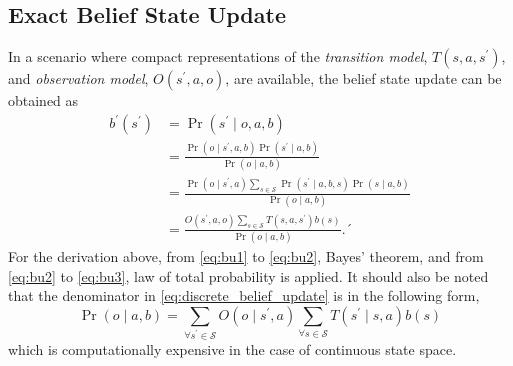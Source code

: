\subsection{Exact Belief State Update}
\label{sec:exact_update}
In a scenario where compact representations of the \textit{transition model}, $ T(s, a, s^{\prime})$,  and \textit{observation model}, $ O(s^{\prime}, a, o) $, are available, the belief state update can be obtained as \cite{KAELBLING199899}
\begin{align}
b^{\prime}\left(s^{\prime}\right) &=\operatorname{Pr}\left(s^{\prime} \mid o, a, b\right) \label{eq:bu1}\\
&=\frac{\operatorname{Pr}\left(o \mid s^{\prime}, a, b\right) \operatorname{Pr}\left(s^{\prime} \mid a, b\right)}{\operatorname{Pr}(o \mid a, b)} \label{eq:bu2}\\
&=\frac{\operatorname{Pr}\left(o \mid s^{\prime}, a\right) \sum_{s \in \mathcal{S}} \operatorname{Pr}\left(s^{\prime} \mid a, b, s\right) \operatorname{Pr}(s \mid a, b)}{\operatorname{Pr}(o \mid a, b)}  \label{eq:bu3}\\
&=\frac{O\left(s^{\prime}, a, o\right) \sum_{s \in \mathcal{S}} T\left(s,a, s^{\prime}\right) b(s)}{\operatorname{Pr}(o \mid a, b)}.´
\label{eq:discrete_belief_update}
\end{align}
For the derivation above, from \autoref{eq:bu1} to \autoref{eq:bu2}, Bayes' theorem, and from \autoref{eq:bu2} to \autoref{eq:bu3}, law of total probability is applied. It should also be noted that the denominator in \autoref{eq:discrete_belief_update} is in the following form, 
\begin{equation}
\operatorname{Pr}(o \mid a, b) = \sum_{\forall s^{\prime} \in \mathcal{S}} O(o \mid s^{\prime}, a) \sum_{\forall s \in \mathcal{S}} T(s^{\prime}\mid s,a) b(s)
\label{eq:nasty_denom}
\end{equation}
which is computationally expensive in the case of continuous state space.
